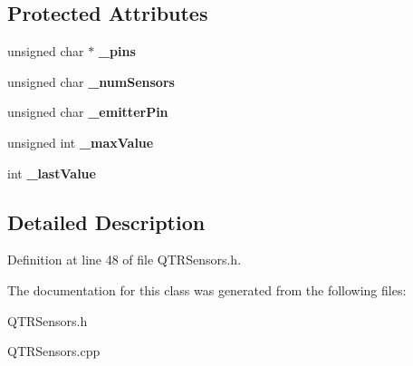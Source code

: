 \subsection*{Protected Attributes}
\begin{DoxyCompactItemize}
\item 
\mbox{\label{class_q_t_r_sensors_ad22b7f2b4778133efa1967d683e5cb46}} 
unsigned char $\ast$ {\bfseries \+\_\+pins}
\item 
\mbox{\label{class_q_t_r_sensors_af4e3b5b4b9fd7acb0914a9f345e446f0}} 
unsigned char {\bfseries \+\_\+num\+Sensors}
\item 
\mbox{\label{class_q_t_r_sensors_a116880e22fe5e5c474e021b91e04e2ac}} 
unsigned char {\bfseries \+\_\+emitter\+Pin}
\item 
\mbox{\label{class_q_t_r_sensors_a88657f1405aa7dc840f2025b53e1a4b3}} 
unsigned int {\bfseries \+\_\+max\+Value}
\item 
\mbox{\label{class_q_t_r_sensors_a9c3c8b7ac645020c77ff8198145b46b6}} 
int {\bfseries \+\_\+last\+Value}
\end{DoxyCompactItemize}


\subsection{Detailed Description}


Definition at line 48 of file Q\+T\+R\+Sensors.\+h.



The documentation for this class was generated from the following files\+:\begin{DoxyCompactItemize}
\item 
Q\+T\+R\+Sensors.\+h\item 
Q\+T\+R\+Sensors.\+cpp\end{DoxyCompactItemize}
